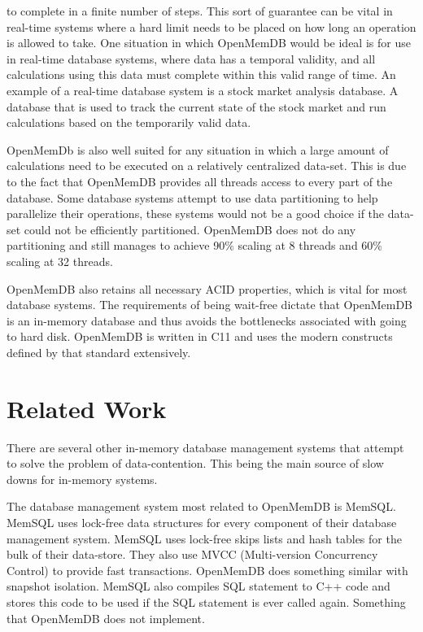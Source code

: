 \documentclass[conference, compsoc]{IEEEtran}
\newcommand{\CC}{C\nolinebreak\hspace{-.05em}\raisebox{.4ex}{\tiny\bf +}\nolinebreak\hspace{-.10em}\raisebox{.4ex}{\tiny\bf +}}
\begin{document}
to complete in a finite number of steps. This sort of guarantee can be vital in 
real-time systems where a hard limit needs to be placed on how long an operation 
is allowed to take. One situation in which OpenMemDB would be ideal is for use in real-time 
database systems, where data has a temporal validity, and all calculations using this data 
must complete within this valid range of time. An example of a real-time database system 
is a stock market analysis database. A database that is used to track the current state
of the stock market and run calculations based on the temporarily valid data. 
\par\vspace{\baselineskip}
OpenMemDb
is also well suited for any situation in which a large amount of calculations need to be 
executed on a relatively centralized data-set. This is due to the fact that OpenMemDB 
provides all threads access to every part of the database. Some database systems attempt to 
use data partitioning to help parallelize their operations, these systems would not be a 
good choice if the data-set could not be efficiently partitioned. OpenMemDB does not do any 
partitioning and still manages to achieve 90\% scaling at 8 threads and 60\% scaling at 32 
threads. 
\par\vspace{\baselineskip}
OpenMemDB also 
retains all necessary ACID properties, which is vital for most database systems. 
The requirements of being wait-free dictate that 
OpenMemDB is an in-memory database and thus avoids the bottlenecks associated with 
going to hard disk. OpenMemDB is written in \CC 11 and uses the modern constructs defined by 
that standard extensively.
\par\vspace{\baselineskip}

\section{Related Work}
There are several other in-memory database management systems that attempt to solve the 
problem of data-contention. This being the main source of slow downs for in-memory systems.

The database management system most related to OpenMemDB is MemSQL.
MemSQL uses lock-free data structures for every component of their database management
system. MemSQL uses lock-free skips lists and hash tables for the bulk of their data-store\cite{MemSQL}.
They also use MVCC (Multi-version Concurrency Control) to provide fast transactions. 
OpenMemDB does something similar with snapshot isolation. MemSQL also compiles SQL
statement to C++ code and stores this code to be used if the SQL statement is ever called
again. Something that OpenMemDB does not implement.
\end{document}
